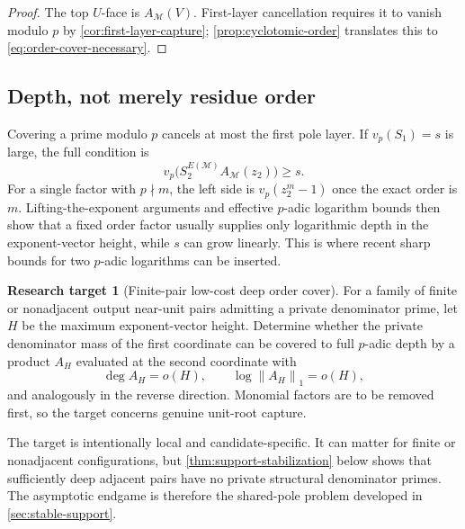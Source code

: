 \documentclass[11pt,oneside]{article}
\theoremstyle{definition}
\newtheorem{target}[theorem]{Research target}
\theoremstyle{remark}
\newcommand{\normone}[1]{\left\lVert #1\right\rVert_1}
\begin{document}
\begin{proof}
The top $U$-face is $A_{\mathcal M}(V)$.  First-layer cancellation requires it to vanish
modulo $p$ by \cref{cor:first-layer-capture}; \cref{prop:cyclotomic-order} translates this to
\eqref{eq:order-cover-necessary}.
\end{proof}

\subsection{Depth, not merely residue order}

Covering a prime modulo $p$ cancels at most the first pole layer.  If
$v_p(S_1)=s$ is large, the full condition is
\begin{equation}
 v_p\bigl(S_2^{E(\mathcal M)}A_{\mathcal M}(z_2)\bigr)\ge s.
 \label{eq:deep-order-cover}
\end{equation}
For a single factor with $p\nmid m$, the left side is
$v_p(z_2^m-1)$ once the exact order is $m$.  Lifting-the-exponent arguments and effective
$p$-adic logarithm bounds then show that a fixed order factor usually supplies only
logarithmic depth in the exponent-vector height, while $s$ can grow linearly.  This is where
recent sharp bounds for two $p$-adic logarithms can be inserted.

\begin{target}[Finite-pair low-cost deep order cover]
\label{target:deep-order-cover}
For a family of finite or nonadjacent output near-unit pairs admitting a private denominator
prime, let $H$ be the maximum exponent-vector height.  Determine whether the private
denominator mass of the first coordinate can be covered to full $p$-adic depth by a product
$A_H$ evaluated at the second coordinate with
\begin{equation}
 \deg A_H=o(H),
 \qquad
 \log\normone{A_H}=o(H),
 \label{eq:low-cost-cover}
\end{equation}
and analogously in the reverse direction.  Monomial factors are to be removed
first, so the target concerns genuine unit-root capture.
\end{target}

The target is intentionally local and candidate-specific.  It can matter for finite or
nonadjacent configurations, but \cref{thm:support-stabilization} below shows that sufficiently
deep adjacent pairs have no private structural denominator primes.  The asymptotic endgame is
therefore the shared-pole problem developed in \cref{sec:stable-support}.
\end{document}
